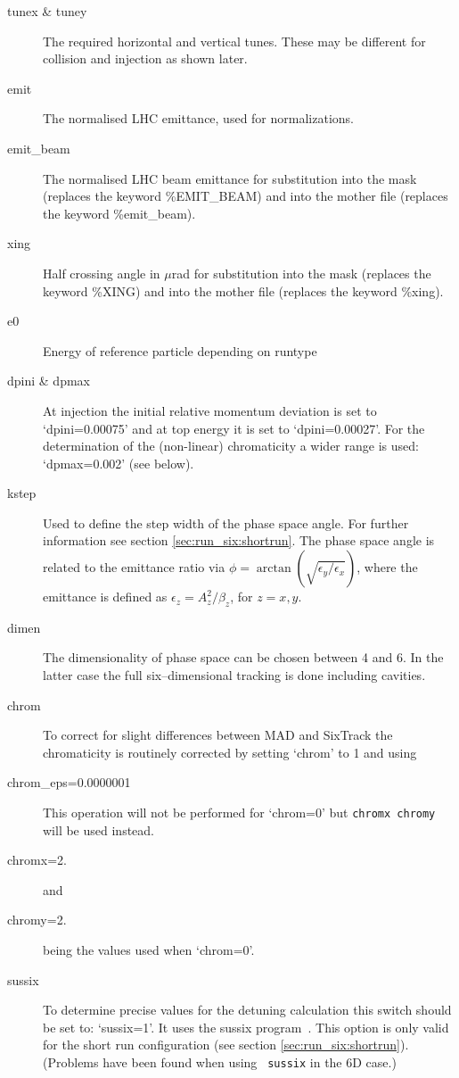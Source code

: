 \documentclass{cernatsnote}
\begin{document}
\begin{description}
\item [tunex \& tuney] The required horizontal and vertical tunes.
These may be different for collision and injection as shown later.
\item [emit] The normalised LHC emittance, used for normalizations.
\item [emit\_beam] The normalised LHC beam emittance for substitution into 
  the mask (replaces the keyword \%EMIT\_BEAM) and into the mother file 
  (replaces the keyword \%emit\_beam).
\item [xing] Half crossing angle in $\mu$rad for substitution into the mask
  (replaces the keyword \%XING) and into the mother file (replaces the keyword \%xing).
\item [e0] Energy of reference particle depending on runtype
\item [dpini \& dpmax]
  At injection the initial relative momentum deviation is set to
  `dpini=0.00075' and at top energy it is set to `dpini=0.00027'.
  For the determination of the (non-linear) chromaticity a wider range is used:
  `dpmax=0.002' (see below).
\item [kstep]
  Used to define the step width of the phase space angle. For further
  information see section \ref{sec:run_six:shortrun}. The phase space angle is
  related to the emittance ratio via
  $\phi=\arctan\left(\sqrt{{\epsilon_y}/{\epsilon_x}}\right)$, where the
  emittance is defined as $\epsilon_z=A_z^2/\beta_z$, for $z=x,y$.
\item [dimen]
  The dimensionality of phase space can be chosen between 4 and 6. In the
  latter case the full six--dimensional tracking is done including cavities.
\item [chrom]
  To correct for slight differences between MAD and SixTrack the chromaticity
  is routinely corrected by setting `chrom' to 1 and using
\item[chrom\_eps=0.0000001] This operation will not be performed for `chrom=0'
  but \texttt{chromx chromy} will be used instead.
\item[chromx=2.] and
\item[chromy=2.] being the values used when `chrom=0'.
\item [sussix]
  To determine precise values for the detuning calculation this switch should
  be set to: `sussix=1'. It uses the sussix program~\cite{lines3}. This option
  is only valid for the short run configuration (see section
  \ref{sec:run_six:shortrun}).  (Problems have been found when using {\tt
  sussix} in the 6D case.)
\end{description}
\end{document}
